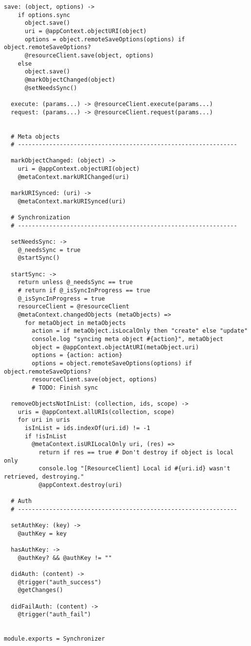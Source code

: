 \begin{lstlisting}[caption=synchronizer.coffee]
  save: (object, options) ->
    if options.sync
      object.save()
      uri = @appContext.objectURI(object)
      options = object.remoteSaveOptions(options) if object.remoteSaveOptions?
      @resourceClient.save(object, options)
    else
      object.save()
      @markObjectChanged(object)
      @setNeedsSync()
  
  execute: (params...) -> @resourceClient.execute(params...)
  request: (params...) -> @resourceClient.request(params...)
    

  # Meta objects
  # ---------------------------------------------------------------
  
  markObjectChanged: (object) ->
    uri = @appContext.objectURI(object)
    @metaContext.markURIChanged(uri)
  
  markURISynced: (uri) ->
    @metaContext.markURISynced(uri)
  
  # Synchronization
  # ---------------------------------------------------------------

  setNeedsSync: ->
    @_needsSync = true
    @startSync()
  
  startSync: ->
    return unless @_needsSync == true
    # return if @_isSyncInProgress == true
    @_isSyncInProgress = true
    resourceClient = @resourceClient
    @metaContext.changedObjects (metaObjects) =>
      for metaObject in metaObjects
        action = if metaObject.isLocalOnly then "create" else "update"
        console.log "syncing meta object #{action}", metaObject
        object = @appContext.objectAtURI(metaObject.uri)
        options = {action: action}
        options = object.remoteSaveOptions(options) if object.remoteSaveOptions?
        resourceClient.save(object, options)
        # TODO: Finish sync
  
  removeObjectsNotInList: (collection, ids, scope) ->
    uris = @appContext.allURIs(collection, scope)
    for uri in uris
      isInList = ids.indexOf(uri.id) != -1
      if !isInList
        @metaContext.isURILocalOnly uri, (res) =>
          return if res == true # Don't destroy if object is local only
          console.log "[ResourceClient] Local id #{uri.id} wasn't retrieved, destroying."
          @appContext.destroy(uri)
    
  # Auth
  # ---------------------------------------------------------------  
  
  setAuthKey: (key) ->
    @authKey = key

  hasAuthKey: ->
    @authKey? && @authKey != ""

  didAuth: (content) ->
    @trigger("auth_success")
    @getChanges()

  didFailAuth: (content) ->
    @trigger("auth_fail")


module.exports = Synchronizer
\end{lstlisting}

